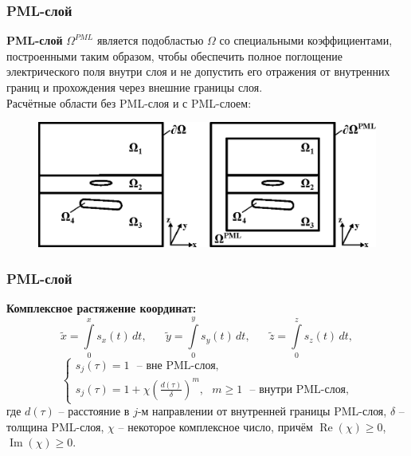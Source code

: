 \documentclass[aspectratio=43,usepdftitle=false]{beamer}
\renewcommand{\Re}{\mathop{\mathrm{Re}}\nolimits}
\renewcommand{\Im}{\mathop{\mathrm{Im}}\nolimits}
\newcommand{\MakeTitle}[1]{\frametitle{\hspace{1.5em}\textbf{#1} \hfill \insertframenumber{} }}
\begin{document}

\begin{frame}
	\MakeTitle{PML-слой}
	\textbf{PML-слой} $\Omega^{PML}$ является подобластью $\Omega$ со специальными коэффициентами, построенными таким образом, чтобы обеспечить полное поглощение электрического поля внутри слоя и не допустить его отражения от внутренних границ и прохождения через внешние границы слоя.\\
	\vspace{0.5em}
	Расчётные области без PML-слоя и с PML-слоем:
	\vspace{-1.25em}
	\begin{figure}[H]
		\includegraphics[width=\textwidth,height=\textheight,keepaspectratio]{area_3layers_PML.eps}
	\end{figure}
\end{frame}


\begin{frame}
	\MakeTitle{PML-слой}
	\textbf{Комплексное растяжение координат:}
	\begin{equation}
		\tilde{x} = \int\limits_0^x s_x (t) \,dt ,
		\text{~~~~~}
		\tilde{y} = \int\limits_0^y s_y (t) \,dt ,
		\text{~~~~~}
		\tilde{z} = \int\limits_0^z s_z (t) \,dt ,
	\end{equation}
	\begin{equation}
		\begin{cases}
		\displaystyle
		s_j(\tau) = 1 \text{~~--~вне PML-слоя,} \\
		\displaystyle
		s_j(\tau) = 1 + \chi \left( \frac{d(\tau)}{\delta} \right)^m , \text{~~} m \geq 1 \text{~~--~внутри PML-слоя,}
		\label{eq:pml_s}
		\end{cases}
	\end{equation}
	где $d(\tau)$ -- расстояние в $j$-м направлении от внутренней границы PML-слоя, $\delta$ -- толщина PML-слоя, $\chi$ -- некоторое комплексное число, причём $\Re(\chi) \ge 0$, $\Im(\chi) \ge 0$.
\end{frame}
\end{document}
